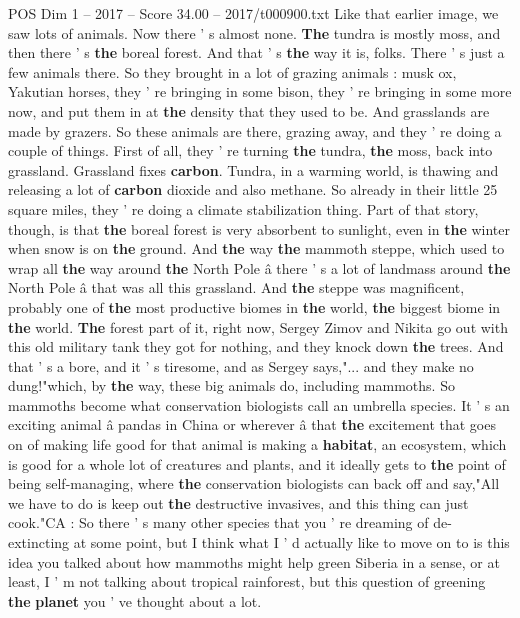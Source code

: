 \begin{textsample}{POS Dim 1 – 2017 – Score 34.00 – 2017/t000900.txt}
Like that earlier image, we saw lots of animals.
Now there ' s almost none. \textbf{The} tundra is mostly moss, and then there ' s \textbf{the} boreal forest.
And that ' s \textbf{the} way it is, folks.
There ' s just a few animals there.
So they brought in a lot of grazing animals : musk ox, Yakutian horses, they ' re bringing in some bison, they ' re bringing in some more now, and put them in at \textbf{the} density that they used to be.
And grasslands are made by grazers.
So these animals are there, grazing away, and they ' re doing a couple of things.
First of all, they ' re turning \textbf{the} tundra, \textbf{the} moss, back into grassland.
Grassland fixes \textbf{carbon}.
Tundra, in a warming world, is thawing and releasing a lot of \textbf{carbon} dioxide and also methane.
So already in their little 25 square miles, they ' re doing a climate stabilization thing.
Part of that story, though, is that \textbf{the} boreal forest is very absorbent to sunlight, even in \textbf{the} winter when snow is on \textbf{the} ground.
And \textbf{the} way \textbf{the} mammoth steppe, which used to wrap all \textbf{the} way around \textbf{the} North Pole â there ' s a lot of landmass around \textbf{the} North Pole â that was all this grassland.
And \textbf{the} steppe was magnificent, probably one of \textbf{the} most productive biomes in \textbf{the} world, \textbf{the} biggest biome in \textbf{the} world. \textbf{The} forest part of it, right now, Sergey Zimov and Nikita go out with this old military tank they got for nothing, and they knock down \textbf{the} trees.
And that ' s a bore, and it ' s tiresome, and as Sergey says,"... and they make no dung!"which, by \textbf{the} way, these big animals do, including mammoths.
So mammoths become what conservation biologists call an umbrella species.
It ' s an exciting animal â pandas in China or wherever â that \textbf{the} excitement that goes on of making life good for that animal is making a \textbf{habitat}, an ecosystem, which is good for a whole lot of creatures and plants, and it ideally gets to \textbf{the} point of being self-managing, where \textbf{the} conservation biologists can back off and say,"All we have to do is keep out \textbf{the} destructive invasives, and this thing can just cook."CA : So there ' s many other species that you ' re dreaming of de-extincting at some point, but I think what I ' d actually like to move on to is this idea you talked about how mammoths might help green Siberia in a sense, or at least, I ' m not talking about tropical rainforest, but this question of greening \textbf{the} \textbf{planet} you ' ve thought about a lot.

\end{textsample}
